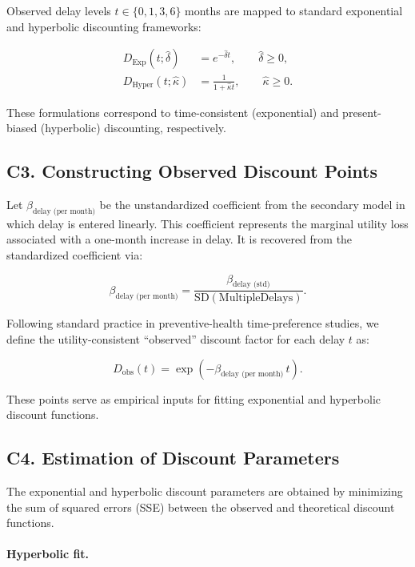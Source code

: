 Observed delay levels $t \in \{0,1,3,6\}$ months are mapped to standard exponential and
hyperbolic discounting frameworks:

\begin{align}
D_{\text{Exp}}(t;\hat{\delta}) &= e^{-\hat{\delta} t}, \qquad \hat{\delta} \ge 0, \tag{C3}\\[4pt]
D_{\text{Hyper}}(t;\hat{\kappa}) &= \frac{1}{1+\hat{\kappa} t}, \qquad \hat{\kappa} \ge 0. \tag{C4}
\end{align}


These formulations correspond to time-consistent (exponential) and present-biased
(hyperbolic) discounting, respectively.

\subsection*{C3. Constructing Observed Discount Points}

Let $\beta_{\text{delay (per month)}}$ be the unstandardized coefficient from the secondary model in
which delay is entered linearly. This coefficient represents the marginal utility loss associated
with a one-month increase in delay. It is recovered from the standardized coefficient via:

\[
\beta_{\text{delay (per month)}} 
= \frac{\beta_{\text{delay (std)}}}{\mathrm{SD}(\text{MultipleDelays})}. \tag{C5}
\]

Following standard practice in preventive-health time-preference studies, we define the
utility-consistent “observed” discount factor for each delay $t$ as:

\[
D_{\text{obs}}(t) 
= \exp\!\left(-\beta_{\text{delay (per month)}}\, t\right). \tag{C6}
\]

These points serve as empirical inputs for fitting exponential and hyperbolic discount functions.

\subsection*{C4. Estimation of Discount Parameters}

The exponential and hyperbolic discount parameters are obtained by minimizing the sum of
squared errors (SSE) between the observed and theoretical discount functions.

\paragraph{Hyperbolic fit.}

